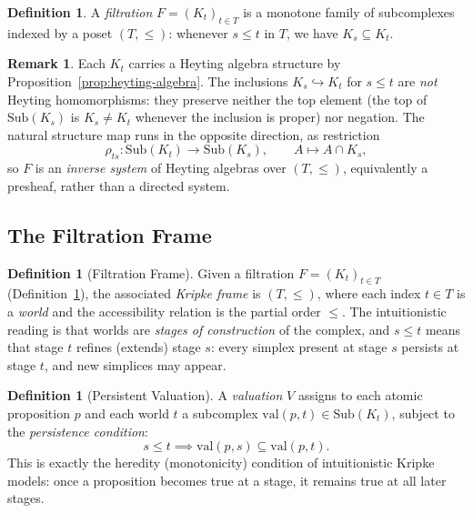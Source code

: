 \documentclass[final,12pt]{elsarticle}
\theoremstyle{plain}
\theoremstyle{definition}
\newtheorem{defi}[thm]{Definition}
\newtheorem{rem}[thm]{Remark}
\begin{document}
\begin{defi}
\label{def:filtration}
A \emph{filtration} \(F = (K_t)_{t \in T}\) is a monotone family of subcomplexes indexed by a poset \((T, \leq)\): whenever \(s \leq t\) in \(T\), we have \(K_s \subseteq K_t\).
\end{defi}

\begin{rem}
\label{rem:filtration-presheaf}
Each \(K_t\) carries a Heyting algebra structure by
Proposition~\ref{prop:heyting-algebra}. The inclusions \(K_s \hookrightarrow K_t\)
for \(s \le t\) are \emph{not} Heyting homomorphisms: they preserve neither the top
element (the top of \(\mathrm{Sub}(K_s)\) is \(K_s \ne K_t\) whenever the inclusion
is proper) nor negation. The natural structure map runs in the opposite direction,
as restriction
\[
  \rho_{ts} : \mathrm{Sub}(K_t) \to \mathrm{Sub}(K_s),
  \qquad A \mapsto A \cap K_s ,
\]
so \(F\) is an \emph{inverse system} of Heyting algebras over \((T,\le)\),
equivalently a presheaf, rather than a directed system.
\end{rem}


\subsection{The Filtration Frame}
\label{subsec:filtration-frame}

\begin{defi}[Filtration Frame]
\label{def:filtration-frame}
Given a filtration \(F = (K_t)_{t \in T}\) (Definition~\ref{def:filtration}), the associated \emph{Kripke frame} is \((T, \leq)\), where each index \(t \in T\) is a \emph{world} and the accessibility relation is the partial order \(\leq\). The intuitionistic reading is that worlds are \emph{stages of construction} of the complex, and \(s \leq t\) means that stage \(t\) refines (extends) stage \(s\): every simplex present at stage \(s\) persists at stage \(t\), and new simplices may appear.
\end{defi}

\begin{defi}[Persistent Valuation]
\label{def:persistent-valuation}
A \emph{valuation} \(V\) assigns to each atomic proposition \(p\) and each world \(t\) a subcomplex \(\mathrm{val}(p, t) \in \mathrm{Sub}(K_t)\), subject to the \emph{persistence condition}:
\[
s \leq t \implies \mathrm{val}(p, s) \subseteq \mathrm{val}(p, t).
\]
This is exactly the heredity (monotonicity) condition of intuitionistic Kripke models: once a proposition becomes true at a stage, it remains true at all later stages.
\end{defi}
\end{document}
